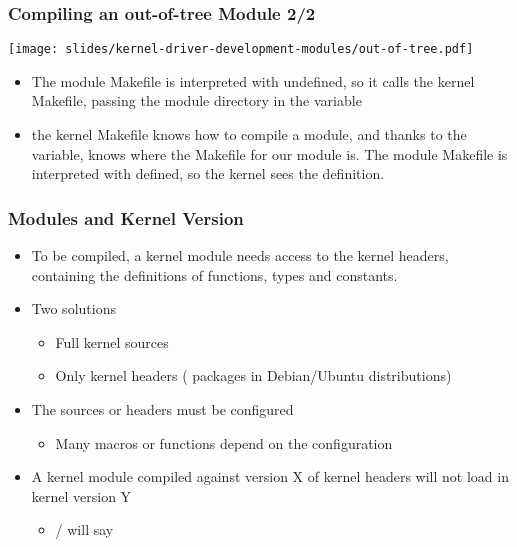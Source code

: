 \begin{frame}
  \frametitle{Compiling an out-of-tree Module 2/2}
  \begin{center}
    \texttt{[image: slides/kernel-driver-development-modules/out-of-tree.pdf]}
  \end{center}
  \begin{itemize}
  \item The module Makefile is interpreted with 
    undefined, so it calls the kernel Makefile, passing the module
    directory in the  variable
  \item the kernel Makefile knows how to compile a module, and thanks
    to the  variable, knows where the Makefile for our module
    is. The module Makefile is interpreted with 
    defined, so the kernel sees the  definition.
  \end{itemize}
\end{frame}

\begin{frame}
  \frametitle{Modules and Kernel Version}
  \begin{itemize}
  \item To be compiled, a kernel module needs access to the kernel
    headers, containing the definitions of functions, types and
    constants.
  \item Two solutions
    \begin{itemize}
    \item Full kernel sources
    \item Only kernel headers ( packages in
      Debian/Ubuntu distributions)
    \end{itemize}
  \item The sources or headers must be configured
    \begin{itemize}
    \item Many macros or functions depend on the configuration
    \end{itemize}
  \item A kernel module compiled against version X of kernel headers
    will not load in kernel version Y
    \begin{itemize}
    \item {} /  will say 
    \end{itemize}
  \end{itemize}
\end{frame}

